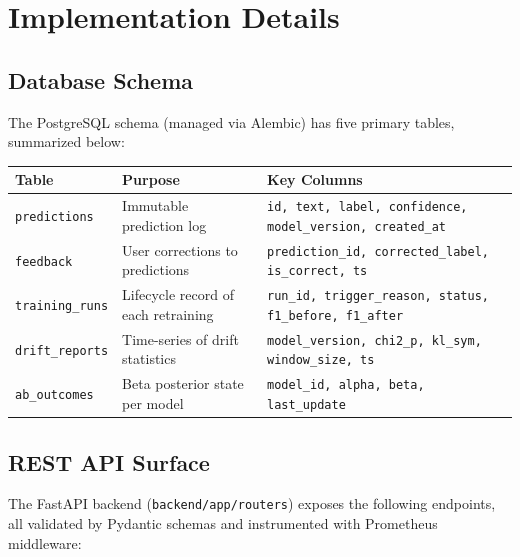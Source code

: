 \documentclass[11pt, a4paper]{article}
\begin{document}
\section{Implementation Details}

\subsection{Database Schema}
The PostgreSQL schema (managed via Alembic) has five primary tables, summarized below:

\begin{center}\small
\begin{tabular}{@{}lll@{}}
\toprule
\textbf{Table} & \textbf{Purpose} & \textbf{Key Columns} \\
\midrule
\texttt{predictions}    & Immutable prediction log                          & \texttt{id, text, label, confidence, model\_version, created\_at} \\
\texttt{feedback}       & User corrections to predictions                   & \texttt{prediction\_id, corrected\_label, is\_correct, ts} \\
\texttt{training\_runs} & Lifecycle record of each retraining               & \texttt{run\_id, trigger\_reason, status, f1\_before, f1\_after} \\
\texttt{drift\_reports} & Time-series of drift statistics                   & \texttt{model\_version, chi2\_p, kl\_sym, window\_size, ts} \\
\texttt{ab\_outcomes}   & Beta posterior state per model                    & \texttt{model\_id, alpha, beta, last\_update} \\
\bottomrule
\end{tabular}
\end{center}

\subsection{REST API Surface}
The FastAPI backend (\texttt{backend/app/routers}) exposes the following endpoints, all validated by Pydantic schemas and instrumented with Prometheus middleware:
\end{document}
